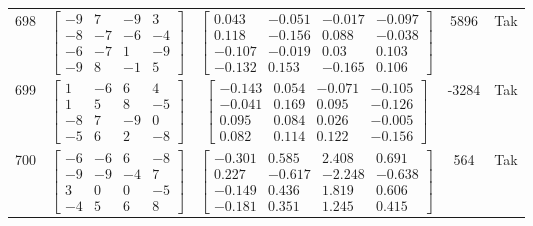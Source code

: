 \documentclass[a4paper,12pt]{article}
\begin{document}
\begin{tabular}{c c c c c}
698
&
$\begin{bmatrix} -9 & 7 & -9 & 3 \\ -8 & -7 & -6 & -4 \\ -6 & -7 & 1 & -9 \\ -9 & 8 & -1 & 5 \end{bmatrix}$
&
$\begin{bmatrix} 0.043 & -0.051 & -0.017 & -0.097 \\ 0.118 & -0.156 & 0.088 & -0.038 \\ -0.107 & -0.019 & 0.03 & 0.103 \\ -0.132 & 0.153 & -0.165 & 0.106 \end{bmatrix}$
&
5896
&
Tak
\\
699
&
$\begin{bmatrix} 1 & -6 & 6 & 4 \\ 1 & 5 & 8 & -5 \\ -8 & 7 & -9 & 0 \\ -5 & 6 & 2 & -8 \end{bmatrix}$
&
$\begin{bmatrix} -0.143 & 0.054 & -0.071 & -0.105 \\ -0.041 & 0.169 & 0.095 & -0.126 \\ 0.095 & 0.084 & 0.026 & -0.005 \\ 0.082 & 0.114 & 0.122 & -0.156 \end{bmatrix}$
&
-3284
&
Tak
\\
700
&
$\begin{bmatrix} -6 & -6 & 6 & -8 \\ -9 & -9 & -4 & 7 \\ 3 & 0 & 0 & -5 \\ -4 & 5 & 6 & 8 \end{bmatrix}$
&
$\begin{bmatrix} -0.301 & 0.585 & 2.408 & 0.691 \\ 0.227 & -0.617 & -2.248 & -0.638 \\ -0.149 & 0.436 & 1.819 & 0.606 \\ -0.181 & 0.351 & 1.245 & 0.415 \end{bmatrix}$
&
564
&
Tak
\\
\end{tabular} \egroup \newpage
\end{document}
